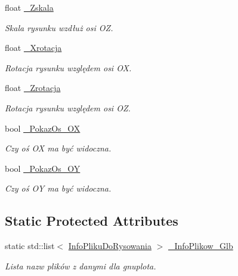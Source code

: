 \begin{DoxyCompactItemize}
float \mbox{\hyperlink{class_pz_g_1_1_lacze_do_g_n_u_plota_a85446d06b2d714b2f852ef43c47c73c1}{\+\_\+\+Zskala}}
\begin{DoxyCompactList}\small\item\em Skala rysunku wzdłuż osi {\itshape OZ}. \end{DoxyCompactList}\item 
float \mbox{\hyperlink{class_pz_g_1_1_lacze_do_g_n_u_plota_a21e77f0a2bfb7fed989b6dc2d64b5a7e}{\+\_\+\+Xrotacja}}
\begin{DoxyCompactList}\small\item\em Rotacja rysunku względem osi {\itshape OX}. \end{DoxyCompactList}\item 
float \mbox{\hyperlink{class_pz_g_1_1_lacze_do_g_n_u_plota_aa65781b1ff96dfb31a780e98ee28d6ed}{\+\_\+\+Zrotacja}}
\begin{DoxyCompactList}\small\item\em Rotacja rysunku względem osi {\itshape OZ}. \end{DoxyCompactList}\item 
bool \mbox{\hyperlink{class_pz_g_1_1_lacze_do_g_n_u_plota_a833aa8994b9913786f920ec8c259731f}{\+\_\+\+Pokaz\+Os\+\_\+\+OX}}
\begin{DoxyCompactList}\small\item\em Czy oś OX ma być widoczna. \end{DoxyCompactList}\item 
bool \mbox{\hyperlink{class_pz_g_1_1_lacze_do_g_n_u_plota_ae8d9b4dac5eae6ce86b7043c45b70ed8}{\+\_\+\+Pokaz\+Os\+\_\+\+OY}}
\begin{DoxyCompactList}\small\item\em Czy oś OY ma być widoczna. \end{DoxyCompactList}\end{DoxyCompactItemize}
\subsection*{Static Protected Attributes}
\begin{DoxyCompactItemize}
\item 
static std\+::list$<$ \mbox{\hyperlink{class_pz_g_1_1_info_pliku_do_rysowania}{Info\+Pliku\+Do\+Rysowania}} $>$ \mbox{\hyperlink{class_pz_g_1_1_lacze_do_g_n_u_plota_ad941e67c018152b068c1c9c66e39812d}{\+\_\+\+Info\+Plikow\+\_\+\+Glb}}
\begin{DoxyCompactList}\small\item\em Lista nazw plików z danymi dla {\itshape gnuplota}. \end{DoxyCompactList}\end{DoxyCompactItemize}


